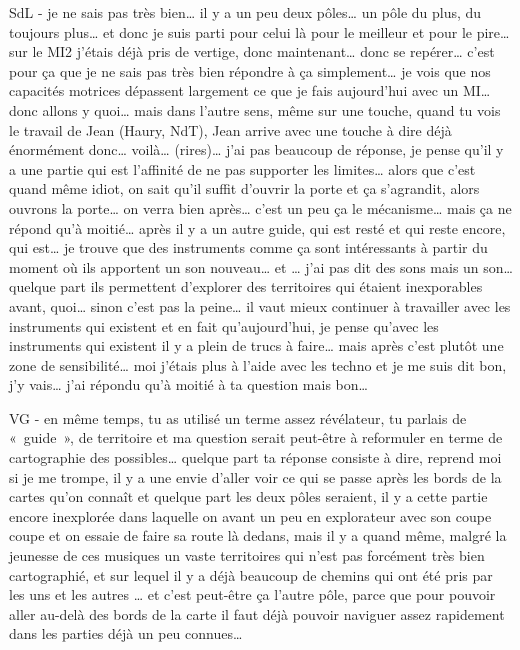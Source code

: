 SdL - je ne sais pas très bien… il y a un peu deux pôles… un pôle du plus, du toujours plus… et donc je suis parti pour celui là pour le meilleur et pour le pire… sur le MI2 j'étais déjà pris de vertige, donc maintenant… donc se repérer…  c'est pour ça que je ne sais pas très bien répondre à ça simplement… je vois que nos capacités motrices dépassent largement ce que je fais aujourd'hui avec un MI… donc allons y quoi… mais dans l'autre sens, même sur une touche, quand tu vois le travail de Jean (Haury, NdT), Jean arrive avec une touche à dire déjà énormément donc… voilà… (rires)… j'ai pas beaucoup de réponse, je pense qu'il y a une partie qui est l'affinité de ne pas supporter les limites… alors que c'est quand même idiot, on sait qu'il suffit d'ouvrir la porte et ça s'agrandit, alors ouvrons la porte… on verra bien après… c'est un peu ça le mécanisme… mais ça ne répond qu'à moitié… après il y a un autre guide, qui est resté et qui reste encore, qui est… je trouve que des instruments comme ça sont intéressants à partir du moment où ils apportent un son nouveau… et … j'ai pas dit des sons mais un son… quelque part ils permettent d'explorer des territoires qui étaient inexporables avant, quoi… sinon c'est pas la peine… il vaut mieux continuer à travailler avec les instruments qui existent et en fait qu'aujourd'hui, je pense qu'avec les instruments qui existent il y a plein de trucs à faire… mais après c'est plutôt une zone de sensibilité… moi j'étais plus à l'aide avec les techno et je me suis dit bon, j'y vais… j'ai répondu qu'à moitié à ta question mais bon… 

VG - en même temps, tu as utilisé un terme assez révélateur, tu parlais de « guide », de territoire et ma question serait peut-être à reformuler en terme de cartographie des possibles… quelque part ta réponse consiste à dire, reprend moi si je me trompe, il y a une envie d'aller voir ce qui se passe après les bords de la cartes qu'on connaît et quelque part les deux pôles seraient, il y a cette partie encore inexplorée dans laquelle on avant un peu en explorateur avec son coupe coupe et on essaie de faire sa route là dedans, mais il y a quand même, malgré la jeunesse de ces musiques un vaste territoires qui n'est pas forcément très bien cartographié, et sur lequel il y a déjà beaucoup de chemins qui ont été pris par les uns et les autres … et c'est peut-être ça l'autre pôle, parce que pour pouvoir aller au-delà des bords de la carte il faut déjà pouvoir naviguer assez rapidement dans les parties déjà un peu connues… 

